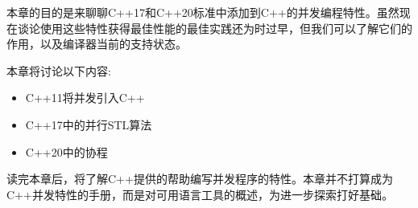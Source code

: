 本章的目的是来聊聊C++17和C++20标准中添加到C++的并发编程特性。虽然现在谈论使用这些特性获得最佳性能的最佳实践还为时过早，但我们可以了解它们的作用，以及编译器当前的支持状态。

本章将讨论以下内容:

\begin{itemize}
\item
C++11将并发引入C++

\item
C++17中的并行STL算法

\item
C++20中的协程
\end{itemize}

读完本章后，将了解C++提供的帮助编写并发程序的特性。本章并不打算成为C++并发特性的手册，而是对可用语言工具的概述，为进一步探索打好基础。